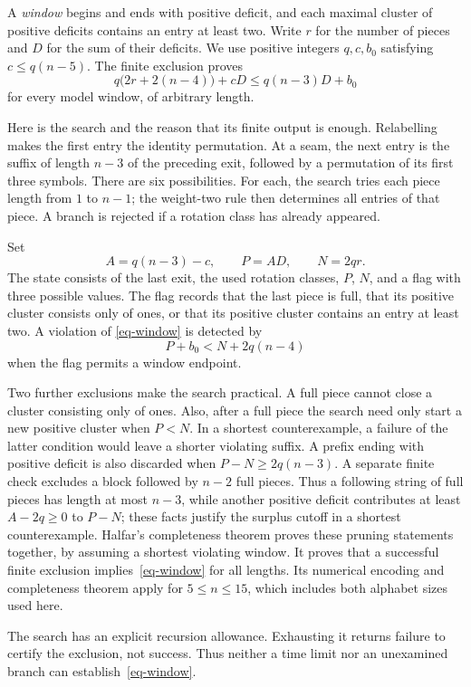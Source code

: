 \documentclass[11pt]{article}
\begin{document}
A \emph{window} begins and ends with positive deficit, and each maximal
cluster of positive deficits contains an entry at least two. Write $r$
for the number of pieces and $D$ for the sum of their deficits. We use
positive integers $q,c,b_0$ satisfying $c\le q(n-5)$. The finite exclusion
proves
\begin{equation}\label{eq-window}
 q\bigl(2r+2(n-4)\bigr)+cD
 \le q(n-3)D+b_0
\end{equation}
for every model window, of arbitrary length.

Here is the search and the reason that its finite output is enough.
Relabelling makes the first entry the identity permutation. At a seam,
the next entry is the suffix of length $n-3$ of the preceding exit,
followed by a permutation of its first three symbols. There are six
possibilities. For each, the search tries each piece length from $1$ to
$n-1$; the weight-two rule then determines all entries of that piece.
A branch is rejected if a rotation class has already appeared.

Set
\[
 A=q(n-3)-c,\qquad P=AD,\qquad N=2qr.
\]
The state consists of the last exit, the used rotation classes, $P$, $N$,
and a flag with three possible values. The flag records that the last
piece is full, that its positive cluster consists only of ones, or that
its positive cluster contains an entry at least two. A violation of
\eqref{eq-window} is detected by
\[
 P+b_0<N+2q(n-4)
\]
when the flag permits a window endpoint.

Two further exclusions make the search practical. A full piece cannot
close a cluster consisting only of ones. Also, after a full piece the
search need only start a new positive cluster when $P<N$. In a shortest
counterexample, a failure of the latter condition would leave a shorter
violating suffix. A prefix ending with positive deficit is also discarded
when $P-N\ge2q(n-3)$. A separate finite check excludes a block followed
by $n-2$ full pieces. Thus a following string of full pieces has length
at most $n-3$, while another positive deficit contributes at least
$A-2q\ge0$ to $P-N$; these facts justify the surplus cutoff in a
shortest counterexample.
Halfar's completeness theorem proves these pruning statements together,
by assuming a shortest violating window. It proves that a successful
finite exclusion implies~\eqref{eq-window} for all lengths. Its numerical
encoding and completeness theorem apply for $5\le n\le15$, which includes
both alphabet sizes used here.

The search has an explicit recursion allowance. Exhausting it returns
failure to certify the exclusion, not success. Thus neither a time
limit nor an unexamined branch can establish~\eqref{eq-window}.
\end{document}
